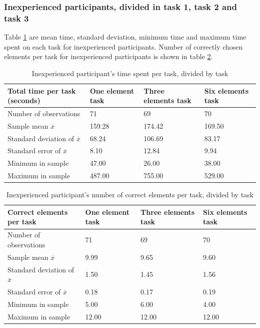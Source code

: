 \subsubsection{Inexperienced participants, divided in task 1, task 2 and task 3}\label{sec:taskdivided_inexperienced}

Table \ref{tab:totaltime_tasks_inexperienced} are mean time, standard deviation, minimum time and maximum time spent on each task for inexperienced participants. Number of correctly chosen elements per task for inexperienced participants is shown in table \ref{tab:totalcorrect_tasks_inexperienced}. 

\begin{table}[H]
	\centering
	\begin{tabular}{l|l|l|l}
		Total time per task (seconds) & One element task & Three elements task & Six elements task \\ \hline
		Number of observations & 71    & 69  & 70   \\
		Sample mean $\overline{x}$  & 159.28  &  174.42  &  169.50  \\
		Standard deviation of $\overline{x}$  & 68.24  & 106.69  & 83.17   \\
		Standard error of $\overline{x}$  & 8.10  & 12.84  & 9.94   \\
		Minimum in sample & 47.00 & 26.00 &  38.00 \\
		Maximum in sample & 487.00 & 755.00  & 529.00  \\ \hline
	\end{tabular}
	\caption[Total time, inexperienced per task]{Inexperienced participant's time spent per task, divided by task}
	\label{tab:totaltime_tasks_inexperienced}
\end{table}

\begin{table}[H]
	\centering
	\begin{tabular}{l|l|l|l}
		Correct elements per task & One element task & Three elements task & Six elements task \\ \hline
		Number of observations & 71    & 69  & 70  \\
		Sample mean $\overline{x}$  & 9.99  &  9.65  &  9.60  \\
		Standard deviation of $\overline{x}$  & 1.50  & 1.45  & 1.56   \\
		Standard error of $\overline{x}$  & 0.18 & 0.17 & 0.19  \\
		Minimum in sample  & 5.00 & 6.00 &  4.00  \\
		Maximum in sample  & 12.00 & 12.00  & 12.00 \\ \hline
	\end{tabular}
	\caption[Correct elements, inexperienced per task]{Inexperienced participant's number of correct elements per task, divided by task}
	\label{tab:totalcorrect_tasks_inexperienced}
\end{table}

